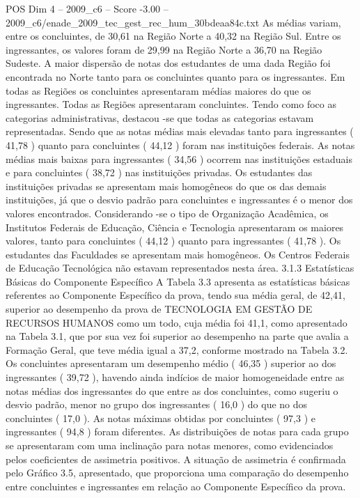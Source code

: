 \begin{textsample}{POS Dim 4 – 2009\_c6 – Score -3.00 – 2009\_c6/enade\_2009\_tec\_gest\_rec\_hum\_30bdeaa84c.txt}
As médias variam, entre os concluintes, de 30,61 na Região Norte a 40,32 na Região Sul.
Entre os ingressantes, os valores foram de 29,99 na Região Norte a 36,70 na Região Sudeste.
A maior dispersão de notas dos estudantes de uma dada Região foi encontrada no Norte tanto para os concluintes quanto para os ingressantes.
Em todas as Regiões os concluintes apresentaram médias maiores do que os ingressantes.
Todas as Regiões apresentaram concluintes.
Tendo como foco as categorias administrativas, destacou -se que todas as categorias estavam representadas.
Sendo que as notas médias mais elevadas tanto para ingressantes ( 41,78 ) quanto para concluintes ( 44,12 ) foram nas instituições federais.
As notas médias mais baixas para ingressantes ( 34,56 ) ocorrem nas instituições estaduais e para concluintes ( 38,72 ) nas instituições privadas.
Os estudantes das instituições privadas se apresentam mais homogêneos do que os das demais instituições, já que o desvio padrão para concluintes e ingressantes é o menor dos valores encontrados.
Considerando -se o tipo de Organização Acadêmica, os Institutos Federais de Educação, Ciência e Tecnologia apresentaram os maiores valores, tanto para concluintes ( 44,12 ) quanto para ingressantes ( 41,78 ).
Os estudantes das Faculdades se apresentam mais homogêneos.
Os Centros Federais de Educação Tecnológica não estavam representados nesta área. 3.1.3 Estatísticas Básicas do Componente Específico A Tabela 3.3 apresenta as estatísticas básicas referentes ao Componente Específico da prova, tendo sua média geral, de 42,41, superior ao desempenho da prova de TECNOLOGIA EM GESTÃO DE RECURSOS HUMANOS como um todo, cuja média foi 41,1, como apresentado na Tabela 3.1, que por sua vez foi superior ao desempenho na parte que avalia a Formação Geral, que teve média igual a 37,2, conforme mostrado na Tabela 3.2.
Os concluintes apresentaram um desempenho médio ( 46,35 ) superior ao dos ingressantes ( 39,72 ), havendo ainda indícios de maior homogeneidade entre as notas médias dos ingressantes do que entre as dos concluintes, como sugeriu o desvio padrão, menor no grupo dos ingressantes ( 16,0 ) do que no dos concluintes ( 17,0 ).
As notas máximas obtidas por concluintes ( 97,3 ) e ingressantes ( 94,8 ) foram diferentes.
As distribuições de notas para cada grupo se apresentaram com uma inclinação para notas menores, como evidenciados pelos coeficientes de assimetria positivos.
A situação de assimetria é confirmada pelo Gráfico 3.5, apresentado, que proporciona uma comparação do desempenho entre concluintes e ingressantes em relação ao Componente Específico da prova.

\end{textsample}
